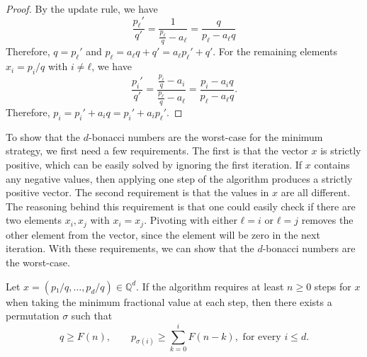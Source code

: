 \begin{proof}
  By the update rule, we have
  \[
    \frac{p_ℓ'}{q'} = \frac{1}{\frac{p_ℓ}{q} - a_ℓ} = \frac{q}{p_ℓ - a_ℓ q}
  \]
  Therefore, $q = p_ℓ'$ and $p_ℓ = a_ℓ q + q' = a_ℓ p_ℓ' + q'$.
  For the remaining elements $x_i = p_i/q$ with $i ≠ ℓ$, we have
  \[
    \frac{p_i'}{q'} = \frac{\frac{p_i}{q} - a_i}{\frac{p_ℓ}{q} - a_ℓ} = \frac{p_i - a_i q}{p_ℓ - a_ℓ q}.
  \]
  Therefore, $p_i = p_i' + a_i q = p_i' + a_i p_ℓ'$.
\end{proof}

To show that the $d$-bonacci numbers are the worst-case for the minimum
strategy, we first need a few requirements.
The first is that the vector $x$ is strictly positive,
which can be easily solved by ignoring the first iteration.
If $x$ contains any negative values, then applying one step of the algorithm
produces a strictly positive vector.
The second requirement is that the values in $x$ are all different.
The reasoning behind this requirement is that one could easily check if there
are two elements $x_i, x_j$ with $x_i = x_j$.
Pivoting with either $ℓ = i$ or $ℓ = j$ removes the other element from the
vector, since the element will be zero in the next iteration.
With these requirements, we can show that the $d$-bonacci numbers are the worst-case.

\begin{theorem}
  Let $x = (p₁/q, …, p_d/q) ∈ ℚ^d$.
  If the algorithm requires at least $n ≥ 0$ steps for $x$ when taking the
  minimum fractional value at each step, then there exists a permutation $σ$
  such that
  \[
    q ≥ F(n),
    \qquad
    p_{σ(i)} ≥ \sum_{k = 0}^i F(n - k),
    \text{ for every } i ≤ d.
  \]
\end{theorem}

